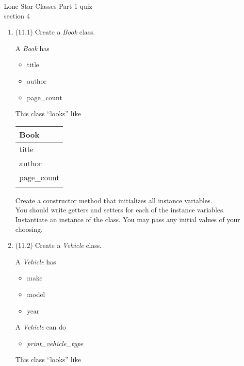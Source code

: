 \documentclass{article}
\begin{document}

Lone Star \hfill Classes Part 1 quiz\\
section 4\\
\begin{enumerate}
\item (11.1) Create a \textit{Book} class.\\	
	\begin{minipage}{.6\textwidth}
		A \textit{Book} has
		\begin{itemize}
			\item title 
			\item author
			\item page\_count	
		\end{itemize}
	\end{minipage}
	\begin{minipage}{.4\textwidth}
		This class ``looks'' like 
				
		\vspace*{1em}
		\begin{tabular}{|l|}
			\hline Book\\ \hline
			title\\ author\\ page\_count\\ \hline
			\\  \hline
		\end{tabular}
	\end{minipage}

	\vspace*{2ex}
	Create a constructor method that initializes all instance variables.\\
	You should write getters and setters for each of the instance variables.\\
	Instantiate an instance of the class. You may pass any initial values of your choosing.


\item (11.2) Create a \textit{Vehicle} class.\\
	\begin{minipage}{.6\textwidth}	
		A \textit{Vehicle} has
		\begin{itemize}
			\item make 
			\item model
			\item year	
		\end{itemize}
		
		A \textit{Vehicle} can do
		\begin{itemize}
			\item \textit{print\_vehicle\_type}
		\end{itemize}
	\end{minipage}
	\begin{minipage}{.4\textwidth}
		This class ``looks'' like 
				

\end{minipage}
\end{enumerate}
\end{document}
